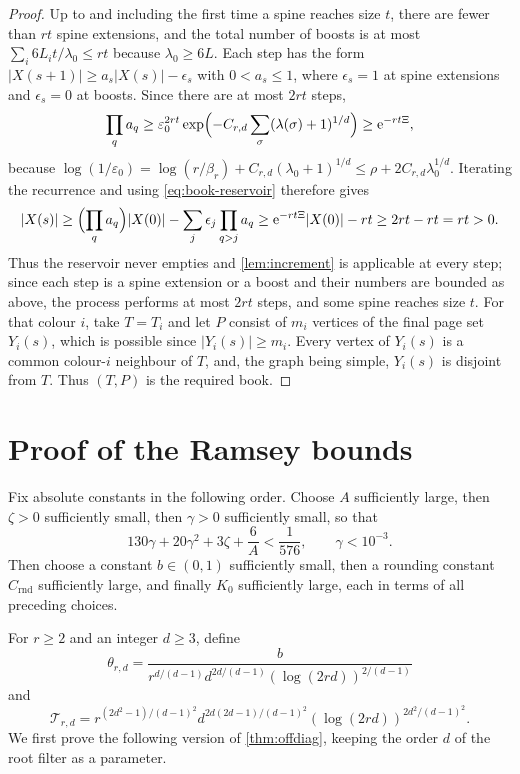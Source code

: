 \documentclass[11pt]{article}
\theoremstyle{definition}
\newcommand{\e}{\mathrm e}
\begin{document}
\begin{proof}
Up to and including the first time a spine reaches size $t$, there are fewer
than $rt$ spine extensions, and the total number of boosts is at most
$\sum_i6L_it/\lambda_0\le rt$ because $\lambda_0\ge6L$.  Each step has the
form $|X(s+1)|\ge a_s|X(s)|-\epsilon_s$ with $0<a_s\le1$, where
$\epsilon_s=1$ at spine extensions and $\epsilon_s=0$ at boosts.  Since
there are at most $2rt$ steps,
\[
 \prod_qa_q
 \ge\varepsilon_0^{2rt}
 \exp\Bigl(-C_{r,d}\sum_{\sigma}(\lambda(\sigma)+1)^{1/d}\Bigr)
 \ge\e^{-rt\Xi},
\]
because $\log(1/\varepsilon_0)=\log(r/\beta_r)+C_{r,d}(\lambda_0+1)^{1/d}
\le\rho+2C_{r,d}\lambda_0^{1/d}$.  Iterating the recurrence and using
\eqref{eq:book-reservoir} therefore gives
\[
 |X(s)|\ge\Bigl(\prod_qa_q\Bigr)|X(0)|
 -\sum_j\epsilon_j\prod_{q>j}a_q
 \ge\e^{-rt\Xi}|X(0)|-rt\ge2rt-rt=rt>0.
\]
Thus the reservoir never empties and \cref{lem:increment} is applicable at
every step; since each step is a spine extension or a boost and their
numbers are bounded as above, the process performs at most $2rt$ steps, and
some spine reaches size $t$.  For that colour $i$, take $T=T_i$ and let $P$ consist of
$m_i$ vertices of the final page set $Y_i(s)$, which is possible since
$|Y_i(s)|\ge m_i$.  Every vertex of $Y_i(s)$ is a common colour-$i$
neighbour of $T$, and, the graph being simple, $Y_i(s)$ is disjoint from
$T$.  Thus $(T,P)$ is the required book.
\end{proof}

\section{Proof of the Ramsey bounds}\label{sec:mainproof}
Fix absolute constants in the following order.  Choose $A$ sufficiently
large, then $\zeta>0$ sufficiently small, then $\gamma>0$ sufficiently small,
so that
\begin{equation}\label{eq:constant-choice}
 130\gamma+20\gamma^2+3\zeta+\frac6A<\frac1{576},
 \qquad \gamma<10^{-3}.
\end{equation}
Then choose a constant $b\in(0,1)$ sufficiently small, then a rounding
constant $C_{\mathrm{rnd}}$ sufficiently large, and finally $K_0$
sufficiently large, each in terms of all preceding choices.

For $r\ge2$ and an integer $d\ge3$, define
\begin{equation}\label{eq:theta}
 \theta_{r,d}
 =\frac{b}{
 r^{d/(d-1)}d^{2d/(d-1)}
 (\log(2rd))^{2/(d-1)}}
\end{equation}
and
\begin{equation}\label{eq:T}
 \mathcal T_{r,d}
 =r^{(2d^2-1)/(d-1)^2}
  d^{2d(2d-1)/(d-1)^2}
  (\log(2rd))^{2d^2/(d-1)^2}.
\end{equation}
We first prove the following version of \cref{thm:offdiag}, keeping the
order $d$ of the root filter as a parameter.
\end{document}
